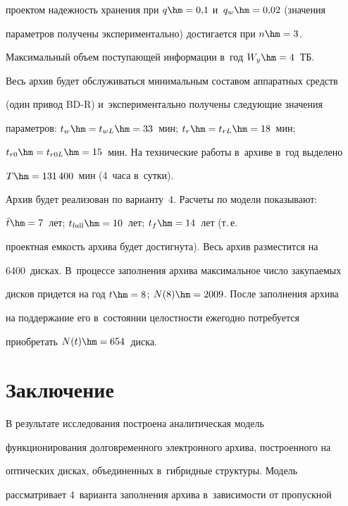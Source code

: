 проектом надежность хранения при $q\hm = 0{,}1$ и~$q_w\hm = 0{,}02$ (значения 


параметров получены экспериментально) достигается при $n\hm = 3$. 


Максимальный объем поступающей информации в~год $W_y\hm = 4$~ТБ. 


Весь архив будет обслуживаться минимальным составом аппаратных средств 


(один привод BD-R) и~экспериментально получены следующие значения 


параметров: $t_w\hm = t_{wL}\hm = 33$~мин; $t_r\hm = t_{rL}\hm = 18$~мин; 


$t_{r0}\hm = t_{r0L}\hm= 15$~мин. На технические работы в~архиве в~год выделено 


$T\hm = 131\,400$~мин (4~часа в~сутки).


  


  


  Архив будет реализован по варианту~4. Расчеты по модели показывают:


  $\tilde{t}\hm=7$~лет; $t_{\mathrm{full}}\hm= 10$~лет; $t_f\hm= 14$~лет (т.\,е.\ 


проектная емкость архива будет достигнута). Весь архив разместится на 


6400~дисках. В~процессе заполнения архива максимальное число закупаемых 


дисков придется на год $t \hm= 8$; $N(8)\hm = 2009$. После заполнения архива 


на поддержание его в~состоянии целостности ежегодно потребуется 


приобретать $N(t)\hm = 654$~диска.





\section{Заключение}





  В результате исследования построена аналитическая модель 


функционирования долговременного электронного архива, построенного на 


оптических дисках, объединенных в~гибридные структуры. Модель 


рассматривает 4~варианта заполнения архива в~зависимости от пропускной 


